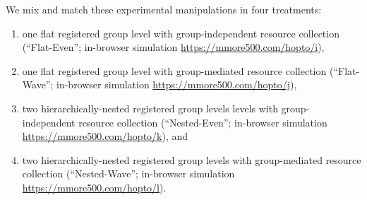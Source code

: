 We mix and match these experimental manipulations in four treatments:
\begin{enumerate}
\item one flat registered group level with group-independent resource collection (``Flat-Even''; in-browser simulation \url{https://mmore500.com/hopto/i}),
\item one flat registered group level with group-mediated resource collection (``Flat-Wave''; in-browser simulation \url{https://mmore500.com/hopto/j}),
\item two hierarchically-nested registered group levels levels with group-independent resource collection (``Nested-Even''; in-browser simulation \url{https://mmore500.com/hopto/k}), and
\item two hierarchically-nested registered group levels with group-mediated resource collection (``Nested-Wave''; in-browser simulation \url{https://mmore500.com/hopto/l}).
\end{enumerate}

